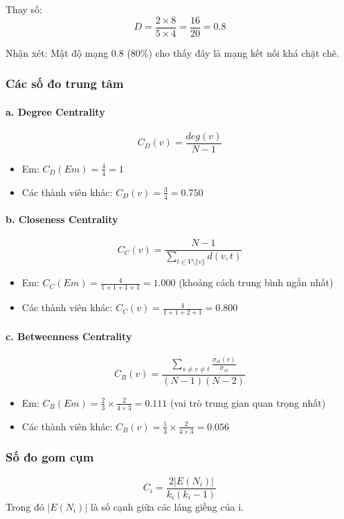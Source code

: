 \documentclass[12pt,a4paper]{article}
\begin{document}
Thay số:
\[ D = \frac{2 \times 8}{5 \times 4} = \frac{16}{20} = 0.8 \]

Nhận xét: Mật độ mạng 0.8 (80\%) cho thấy đây là mạng kết nối khá chặt chẽ.

\subsubsection{Các số đo trung tâm}
\paragraph{a. Degree Centrality}
\[ C_D(v) = \frac{deg(v)}{N-1} \]

\begin{itemize}
\item Em: $C_D(Em) = \frac{4}{4} = 1$
\item Các thành viên khác: $C_D(v) = \frac{3}{4} = 0.750$
\end{itemize}

\paragraph{b. Closeness Centrality}
\[ C_C(v) = \frac{N-1}{\sum_{t \in V\setminus\{v\}} d(v,t)} \]

\begin{itemize}
\item Em: $C_C(Em) = \frac{4}{1+1+1+1} = 1.000$ (khoảng cách trung bình ngắn nhất)
\item Các thành viên khác: $C_C(v) =\frac{4}{1+1+2+1} = 0.800$
\end{itemize}

\paragraph{c. Betweenness Centrality}
\[ C_B(v) = \frac{\sum_{s \neq v \neq t} \frac{\sigma_{st}(v)}{\sigma_{st}}}{(N-1)(N-2)} \]

\begin{itemize}
\item Em: $C_B(Em) = \frac{2}{3}\times\frac{2}{4\times 3} = 0.111$ (vai trò trung gian quan trọng nhất)
\item Các thành viên khác: $C_B(v) = \frac{1}{3}\times\frac{2}{4\times 3} = 0.056$
\end{itemize}

\subsubsection{Số đo gom cụm}
\[ C_i = \frac{2|E(N_i)|}{k_i(k_i-1)} \]
Trong đó $|E(N_i)|$ là số cạnh giữa các láng giềng của i.
\end{document}

